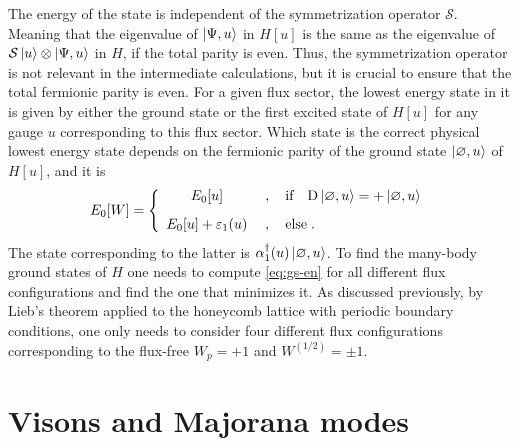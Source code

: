 The energy of the state is independent of the symmetrization operator $\mathcal{S}$.
Meaning that the eigenvalue of $\ket{\Psi,u}$ in $H[u]$ is the same as the eigenvalue of $\mathcal{S}\ket{u}\otimes \ket{\Psi,u}$ in $H$, if the total parity is even.
Thus, the symmetrization operator is not relevant in the intermediate calculations, %
but it is crucial to ensure that the total fermionic parity is even.
For a given flux sector, the lowest energy state in it is given by either the ground state or the first excited state of $H[u]$ for any gauge $u$ corresponding to this flux sector.
Which state is the correct physical lowest energy state depends on the fermionic parity of the ground state $\ket{\varnothing,u}$ of $H[u]$, and it is
\begin{equation}
    E_{0}[W]= \left\{ \begin{array}{cl}
        E_{0}[u] & \; , \quad \text{if} \quad \mathrm{D}\ket{\varnothing,u}= + \ket{\varnothing,u}  \\[8pt]
        E_{0}[u] + \varepsilon_1(u) &\; , \quad \text{else} \; .
    \end{array} \right. \label{eq:gs-en}
\end{equation}
The state corresponding to the latter is $\alpha_1^\dagger(u) \ket{\varnothing,u}  $.
To find the many-body ground states of $H$ one needs to compute \eqref{eq:gs-en} for all different flux configurations and find the one that minimizes it. As discussed previously, by Lieb's theorem applied to the honeycomb lattice with periodic boundary conditions, one only needs to consider four different flux configurations corresponding to the flux-free $W_p=+1$ and $W^{(1/2)}=\pm 1$.




\section[{$\mathbb{Z}_2$}-flux and Majorana modes]{Visons and Majorana modes}

